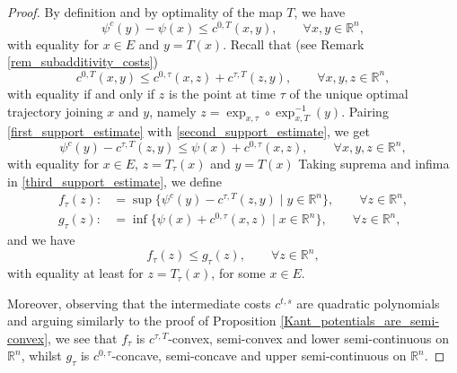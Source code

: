 \documentclass[reqno]{amsart}
\theoremstyle{plain}
\theoremstyle{definition}
\theoremstyle{remark}
\newcommand{\R}{\mathbb{R}}
\begin{document}
\begin{proof}
		By definition and by optimality of the map $T$, we have
		\begin{equation}\label{first_support_estimate}
			\psi^c(y)-\psi(x)\leq c^{0,T}(x,y),\qquad\forall x,y\in\R^n ,
		\end{equation}
		with equality for $x\in E$ and $y=T(x)$.
		Recall that (see Remark \ref{rem_subadditivity_costs})
		\begin{equation}\label{second_support_estimate}
			c^{0,T}(x,y)\leq c^{0,\tau}(x,z)+c^{\tau,T}(z,y),\qquad \forall x,y,z\in\mathbb{R}^n,
		\end{equation}
		with equality if and only if $z$ is the point at time $\tau$ of the unique optimal trajectory joining $x$ and $y$, namely $z=\exp_{x,\tau}\circ\exp_{x,T}^{-1}(y)$. Pairing \eqref{first_support_estimate} with \eqref{second_support_estimate}, we get
		\begin{equation}\label{third_support_estimate}
			\psi^c(y)-c^{\tau,T}(z,y)\leq\psi(x)+c^{0,\tau}(x,z),\qquad \forall x,y,z\in\R^n,
		\end{equation}
		with equality for $x\in E$, $z=T_\tau(x)$ and $y=T(x)$
		Taking suprema and infima in \eqref{third_support_estimate}, we define
		\begin{align}
			f_\tau(z):&=\sup\{\psi^c(y)-c^{\tau,T}(z,y)\mid y\in \R^n\},\qquad\forall z\in\mathbb{R}^n,\\
			g_\tau(z):&=\inf\{\psi(x)+c^{0,\tau}(x,z)\mid x\in \R^n\},\qquad\forall z\in\mathbb{R}^n,
		\end{align}
		and we have
		\begin{equation}
			f_\tau(z)\leq g_\tau(z),\qquad \forall z\in\mathbb{R}^n,
		\end{equation}
		with equality at least for $z=T_\tau(x)$, for some $x\in E$.
		
		Moreover, observing that the intermediate costs $c^{t,s}$ are quadratic polynomials and arguing similarly to the proof of Proposition \ref{Kant_potentials_are_semi-convex}, we see that $f_\tau$ is $c^{\tau,T}$-convex, semi-convex  and lower semi-continuous on $\mathbb{R}^n$, whilst $g_\tau$ is $c^{0,\tau}$-concave, semi-concave and upper semi-continuous on $\mathbb{R}^n$.
        

\end{proof}
\end{document}
